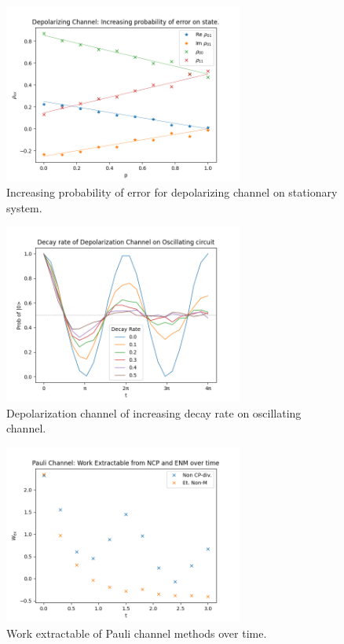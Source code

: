 \documentclass[12pt]{article}
\begin{document}
  \begin{figure}
    \centering
    \includegraphics[width=0.7\textwidth]{images/depolarizing_probability_state.png}
    \caption{Increasing probability of error for depolarizing channel on stationary system.%
      \label{fig:depolarizing_probability_state}}
  \end{figure}

  \begin{figure}
    \centering
    \includegraphics[width=0.7\textwidth]{images/depolarization_decay_oscillating.png}
    \caption{Depolarization channel of increasing decay rate on oscillating channel.%
      \label{fig:depolarization_deay_oscillating}}
  \end{figure}

  \begin{figure}
    \centering
    \includegraphics[width=0.7\textwidth]{images/Pauli_work_extractable.png}
    \caption{Work extractable of Pauli channel methods over time.%
      \label{fig:Pauli_work_extractable}}
  \end{figure}

  \printbibliography
\end{document}
